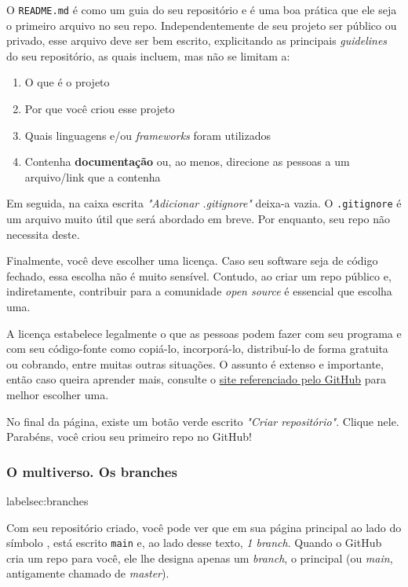 \documentclass{article}
\begin{document}
	
	O \texttt{README.md} é como um guia do seu repositório e é uma boa prática que ele seja o primeiro arquivo no seu repo. 
	Independentemente de seu projeto ser público ou privado, esse arquivo deve ser bem escrito, explicitando as principais 
	\textit{guidelines} do seu repositório, as quais incluem, mas não se limitam a: 

	\begin{enumerate}
		\item{O que é o projeto}
		\item{Por que você criou esse projeto}
		\item{Quais linguagens e/ou \textit{frameworks} foram utilizados}
		\item{Contenha \textbf{documentação} ou, ao menos, direcione as pessoas a um arquivo/link que a contenha}
	\end{enumerate}

	Em seguida, na caixa escrita \textit{"Adicionar .gitignore"} deixa-a vazia. O \texttt{.gitignore} é um arquivo muito útil 
	que será abordado em breve. Por enquanto, seu repo não necessita deste. 
	
	Finalmente, você deve escolher uma licença. Caso seu software seja de código fechado, essa escolha não é muito sensível.
	Contudo, ao criar um repo público e, indiretamente, contribuir para a comunidade \textit{open source} é essencial que escolha 
	uma.

	A licença estabelece legalmente o que as pessoas podem fazer com seu programa e com seu código-fonte como copiá-lo, incorporá-lo,
	distribuí-lo de forma gratuita ou cobrando, entre muitas outras situações. O assunto é extenso e importante, então caso queira 
	aprender mais, consulte o \href{https://choosealicense.com/}{site referenciado pelo GitHub} para melhor escolher uma.

	No final da página, existe um botão verde escrito \textit{"Criar repositório"}. Clique nele. Parabéns, você criou seu primeiro 
	repo no GitHub!

	\subsubsection{O multiverso. Os branches}
	label{sec:branches}

	Com seu repositório criado, você pode ver que em sua página principal ao lado do símbolo , está
	escrito \texttt{main} e, ao lado desse texto, \textit{1 branch}. Quando o GitHub cria um repo para você, ele lhe designa 
	apenas um \textit{branch}, o principal (ou \textit{main}, antigamente chamado de \textit{master}). 
	
\end{document}
